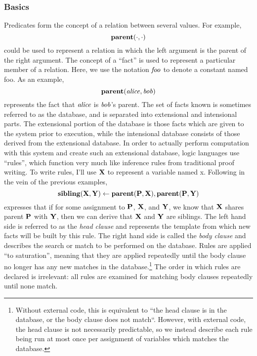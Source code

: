 \subsubsection{Basics}
Predicates form the concept of a relation between several values.
For example,
\[
        {\bf parent}(\cdot, \cdot)
\]
could be used to represent a relation in which the left argument is the parent of the right argument.
The concept of a ``fact'' is used to represent a particular member of a relation.
Here, we use the notation ${\it foo}$ to denote a constant named foo.
As an example,
\[
        {\bf parent}({\it alice}, {\it bob})
\]
represents the fact that ${\it alice}$ is ${\it bob}$'s parent.
The set of facts known is sometimes referred to as the database, and is separated into extensional and intensional parts.
The extensional portion of the database is those facts which are given to the system prior to execution, while the intensional database consists of those derived from the extensional database.
In order to actually perform computation with this system and create such an extensional database, logic languages use ``rules'', which function very much like inference rules from traditional proof writing.
To write rules, I'll use ${\bf X}$ to represent a variable named x.
Following in the vein of the previous examples,
\[
        {\bf sibling}({\bf X}, {\bf Y}) \leftarrow {\bf parent}({\bf P}, {\bf X}), {\bf parent}({\bf P}, {\bf Y})
\]
expresses that if for some assignment to ${\bf P}$, ${\bf X}$, and ${\bf Y}$, we know that ${\bf X}$ shares parent ${\bf P}$ with ${\bf Y}$, then we can derive that ${\bf X}$ and ${\bf Y}$ are siblings.
The left hand side is referred to as the \emph{head clause} and represents the template from which new facts will be built by this rule.
The right hand side is called the \emph{body clause} and describes the search or match to be performed on the database.
Rules are applied ``to saturation'', meaning that they are applied repeatedly until the body clause no longer has any new matches in the database.\footnote {
Without external code, this is equivalent to ``the head clause is in the database, or the body clause does not match``. However, with external code, the head clause is not necessarily predictable, so we instead describe each rule being run at most once per assignment of variables which matches the database.
}
The order in which rules are declared is irrelevant: all rules are examined for matching body clauses repeatedly until none match.
